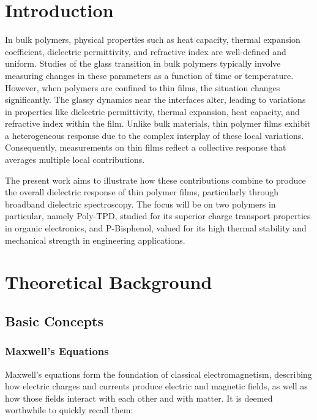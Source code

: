 \chapter{Introduction}

In bulk polymers, physical properties such as heat capacity, thermal expansion coefficient, dielectric permittivity, and refractive index are well-defined and uniform. Studies of the glass transition in bulk polymers typically involve measuring changes in these parameters as a function of time or temperature. However, when polymers are confined to thin films, the situation changes significantly. The glassy dynamics near the interfaces alter, leading to variations in properties like dielectric permittivity, thermal expansion, heat capacity, and refractive index within the film. Unlike bulk materials, thin polymer films exhibit a heterogeneous response due to the complex interplay of these local variations. Consequently, measurements on thin films reflect a collective response that averages multiple local contributions.

The present work aims to illustrate how these contributions combine to produce the overall dielectric response of thin polymer films, particularly through broadband dielectric spectroscopy. The focus will be on two polymers in particular, namely Poly-TPD, studied for its superior charge transport properties in organic electronics, and P-Bisphenol, valued for its high thermal stability and mechanical strength in engineering applications.
\chapter{Theoretical Background}
\section{Basic Concepts}
\subsection{Maxwell's Equations}

Maxwell's equations form the foundation of classical electromagnetism, describing how electric charges and currents produce electric and magnetic fields, as well as how those fields interact with each other and with matter. It is deemed worthwhile to quickly recall them:

